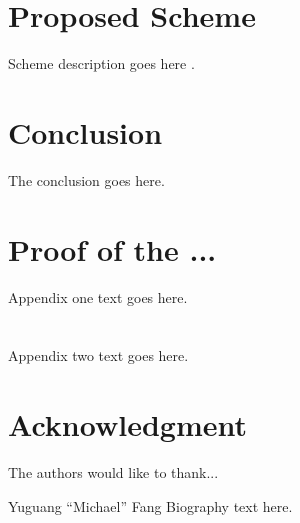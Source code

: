 \documentclass[journal,10pt]{IEEEtran}
\begin{document}
\section{Proposed Scheme}
Scheme description goes here \cite{IEEEhowto:kopka}.



\section{Conclusion}
The conclusion goes here.


\appendices
\section{Proof of the ...}
Appendix one text goes here.


\section{}
Appendix two text goes here.



\section*{Acknowledgment}


The authors would like to thank...



\ifCLASSOPTIONcaptionsoff
  \newpage
\fi





\begin{IEEEbiography}{Yuguang ``Michael'' Fang}
Biography text here.
\end{IEEEbiography}

\end{document}
